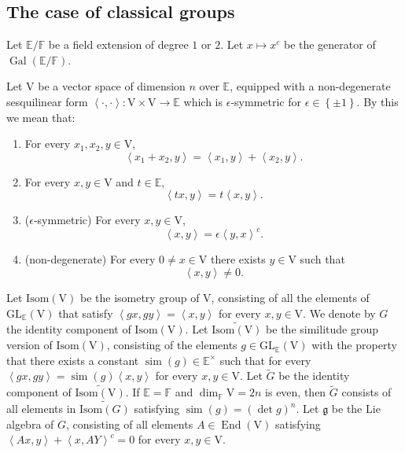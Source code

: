\documentclass[12pt, reqno]{amsart}
\theoremstyle{definition}
\theoremstyle{definition}
\theoremstyle{definition}
\newcommand{\multiplicativegroup}[1]{#1^{\times}}
\newcommand{\EndomorphismRing}{\operatorname{End}}
\newcommand{\hermitianSpace}{\mathrm{V}}
\newcommand{\similitudeCharacter}{\operatorname{sim}}
\newcommand{\innerproduct}[2]{\left\langle #1,#2\right\rangle}
\newcommand{\involution}[1]{#1^{c}}
\newcommand{\GL}{\mathrm{GL}}
\newcommand{\GroupExtension}[1]{\widetilde{#1}}
\newcommand{\finiteField}{\mathbb{F}}
\newcommand{\quadraticExtension}{\mathbb{E}}
\newcommand{\Galois}{\operatorname{Gal}}
\newcommand{\IsometryGroup}{\mathrm{Isom}}
\newcommand{\lieAlgebra}{\mathfrak{g}}
\begin{document}
\subsection{The case of classical groups}

Let $\quadraticExtension \slash \finiteField$ be a field extension of degree $1$ or $2$. Let $x \mapsto \involution{x}$ be the generator of $\Galois\left(\quadraticExtension \slash \finiteField\right)$.

Let $\hermitianSpace$ be a vector space of dimension $n$ over $\quadraticExtension$, equipped with a non-degenerate sesquilinear form $\innerproduct{\cdot}{\cdot} \colon \hermitianSpace \times \hermitianSpace \to \quadraticExtension$ which is $\epsilon$-symmetric for $\epsilon \in \left\{\pm 1\right\}$. By this we mean that:
\begin{enumerate}
	\item For every $x_1,x_2,y \in \hermitianSpace$, $$\innerproduct{x_1 + x_2}{y} = \innerproduct{x_1}{y} + \innerproduct{x_2}{y}.$$
	\item For every $x,y \in \hermitianSpace$ and $t \in \quadraticExtension$, $$\innerproduct{tx}{y} = t\innerproduct{x}{y}.$$
	\item ($\epsilon$-symmetric) For every $x,y \in \hermitianSpace$, $$\innerproduct{x}{y} = \epsilon \involution{\innerproduct{y}{x}}.$$
	\item (non-degenerate) For every $0 \ne x \in \hermitianSpace$ there exists $y \in \hermitianSpace$ such that $$\innerproduct{x}{y} \ne 0.$$
\end{enumerate}
Let $\IsometryGroup \left(\hermitianSpace\right)$ be the isometry group of $\hermitianSpace$, consisting of all the elements of $\GL_{\quadraticExtension}\left(\hermitianSpace\right)$ that satisfy $\innerproduct{gx}{gy} = \innerproduct{x}{y}$ for every $x,y \in \hermitianSpace$. We denote by $G$ the identity component of $\IsometryGroup\left(\hermitianSpace\right)$. Let $\GroupExtension{\IsometryGroup\left(\hermitianSpace\right)}$ be the similitude group version of $\IsometryGroup\left(\hermitianSpace\right)$, consisting of the elements $g \in \GL_{\quadraticExtension}\left(\hermitianSpace\right)$ with the property that there exists a constant $\similitudeCharacter\left(g\right) \in \multiplicativegroup{\quadraticExtension}$ such that for every $\innerproduct{gx}{gy} = \similitudeCharacter\left(g\right) \innerproduct{x}{y}$ for every $x,y \in \hermitianSpace$. Let $\GroupExtension{G}$ be the identity component of $\GroupExtension{\IsometryGroup\left(\hermitianSpace\right)}$. If $\quadraticExtension = \finiteField$ and $\dim_{\finiteField} \hermitianSpace = 2n$ is even, then $\GroupExtension{G}$ consists of all elements in $\GroupExtension{\IsometryGroup\left(G\right)}$ satisfying $\similitudeCharacter\left(g\right) = \left(\det g\right)^n$. Let $\lieAlgebra$ be the Lie algebra of $G$, consisting of all elements $A \in \EndomorphismRing\left(\hermitianSpace\right)$ satisfying $\innerproduct{Ax}{y} + \involution{\innerproduct{x}{AY}} = 0$ for every $x, y \in \hermitianSpace$.
\end{document}

